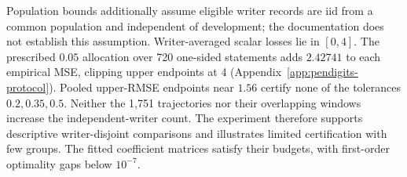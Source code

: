 Population bounds additionally assume eligible writer records are iid from
a common population and independent of development; the documentation does
not establish this assumption. Writer-averaged scalar losses lie in $[0,4]$.
The prescribed $0.05$ allocation over 720 one-sided statements adds
$2.42741$ to each empirical MSE, clipping upper endpoints at 4
(Appendix~\ref{app:pendigits-protocol}). Pooled upper-RMSE endpoints near
$1.56$ certify none of the tolerances $0.2,0.35,0.5$.
Neither the 1,751 trajectories nor their overlapping windows increase the
independent-writer count. The experiment therefore supports descriptive
writer-disjoint comparisons and illustrates limited certification with few
groups. The fitted coefficient matrices satisfy their budgets, with
first-order optimality gaps below $10^{-7}$.
